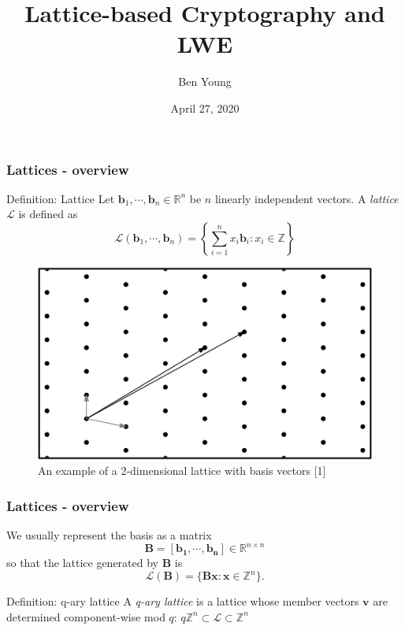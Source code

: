 \documentclass{beamer}
\title{Lattice-based Cryptography and LWE}
\author{Ben Young}
\institute{MATH 408}
\date{April 27, 2020}
\renewcommand{\v}{\mathbf}
\begin{document}
\frame{\titlepage}

\begin{frame}
\frametitle{Lattices - overview}
\begin{block}{Definition: Lattice}
    Let $\v{b}_1,\cdots,\v{b}_n \in \mathbb{R}^n$ be $n$ linearly independent vectors. 
    A \textit{lattice} $\mathcal{L}$ is defined as
\begin{equation*}
    \mathcal{L}(\v{b}_1,\cdots,\v{b}_n) = \left\{\sum_{i=1}^n{x_i\v{b}_i : x_i \in \mathbb{Z}}\right\}
\end{equation*}
\end{block}
\begin{figure}[h!]
    \caption{An example of a 2-dimensional lattice with basis vectors [1]}
    \centering
    \includegraphics[scale=0.3]{lattice.png}
\end{figure}
\end{frame}

\begin{frame}
\frametitle{Lattices - overview}
We usually represent the basis as a matrix 
\begin{equation*}
    \v{B} = [\v{b_1}, \cdots, \v{b_n}] \in \mathbb{R}^{n \times n}
\end{equation*}
so that the lattice generated by $\v{B}$ is
\begin{equation*}
    \mathcal{L}(\v{B}) = \{\v{Bx}: \v{x} \in \mathbb{Z}^n\}.
\end{equation*}
\begin{block}{Definition: q-ary lattice}
A \textit{q-ary lattice} is a lattice whose
member vectors $\v{v}$ are determined component-wise mod $q$:
$q\mathbb{Z}^n \subset \mathcal{L} \subset \mathbb{Z}^n$
\end{block}
\end{frame}
\end{document}
